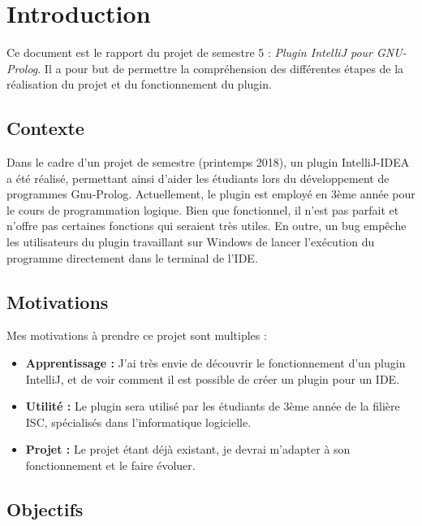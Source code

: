 
\chapter{Introduction}
\noindent
Ce document est le rapport du projet de semestre 5 : \textit{Plugin IntelliJ pour GNU-Prolog}.
Il a pour but de permettre la compréhension des différentes étapes de la réalisation du projet et du fonctionnement du plugin.

\section{Contexte}
\noindent
Dans le cadre d’un projet de semestre (printemps 2018), un plugin IntelliJ-IDEA a été réalisé, permettant ainsi d’aider les étudiants lors du développement de programmes Gnu-Prolog. Actuellement, le plugin est employé en 3ème année pour le cours de programmation logique. Bien que fonctionnel, il n’est pas parfait et n’offre pas certaines fonctions qui seraient très utiles. En outre, un bug empêche les utilisateurs du plugin travaillant sur Windows de lancer l’exécution du programme directement dans le terminal de l’IDE.

\section{Motivations}
\noindent
Mes motivations à prendre ce projet sont multiples :
\begin{itemize}
    \item \textbf{Apprentissage :} J'ai très envie de découvrir le fonctionnement d'un plugin IntelliJ, et de voir comment il est possible de créer un plugin pour un IDE.
    \item \textbf{Utilité :} Le plugin sera utilisé par les étudiants de 3ème année de la filière ISC, spécialisés dans l'informatique logicielle.
    \item \textbf{Projet :} Le projet étant déjà existant, je devrai m'adapter à son fonctionnement et le faire évoluer.
\end{itemize}

\section{Objectifs}
